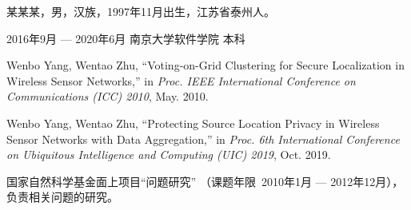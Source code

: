 \documentclass[winfonts,master,twoside,AutoFakeBold= {2}]{njuthesis}
\begin{document}
\backmatter
\begin{resume}
\begin{authorinfo}
\noindent 某某某，男，汉族，1997年11月出生，江苏省泰州人。
\end{authorinfo}
\begin{education}
\item[2016年9月 --- 2020年6月] 南京大学软件学院 \hfill 本科
\end{education}
\begin{publications}
\item Wenbo Yang, Wentao Zhu, ``Voting-on-Grid Clustering for Secure
  Localization in Wireless Sensor Networks,'' in \textsl{Proc. IEEE International
    Conference on Communications (ICC) 2010}, May. 2010.
\item Wenbo Yang, Wentao Zhu, ``Protecting Source Location Privacy
  in Wireless Sensor Networks with Data Aggregation,'' in \textsl{Proc. 6th
    International Conference on Ubiquitous Intelligence and Computing (UIC)
    2019}, Oct. 2019.
\end{publications}
\begin{projects}
\item 国家自然科学基金面上项目“问题研究”
（课题年限~2010年1月 --- 2012年12月），负责相关问题的研究。
\end{projects}
\end{resume}

\statement

\makelicense

\end{document}
